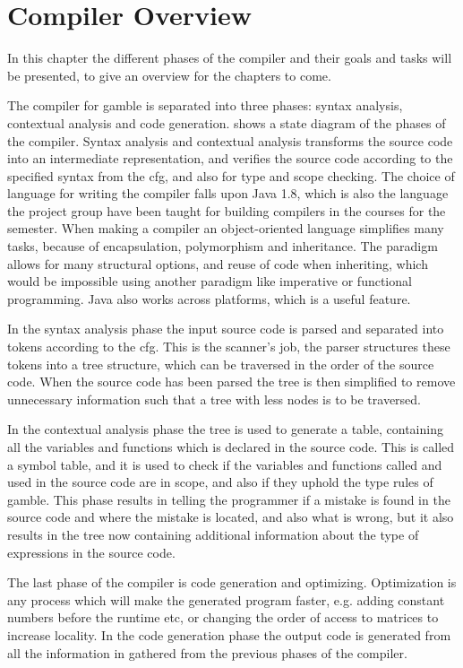 \chapter{Compiler Overview}\label{Chp:CompilerOverview}

In this chapter the different phases of the compiler and their goals and tasks will be presented, to give an overview for the chapters to come.

The compiler for \gls{gamble} is separated into three phases: syntax analysis, contextual analysis and code generation.
 shows a state diagram of the phases of the compiler.
Syntax analysis and contextual analysis transforms the source code into an intermediate representation, and verifies the source code according to the specified syntax from the \acrshort{cfg}, and also for type and scope checking.
The choice of language for writing the compiler falls upon Java 1.8, which is also the language the project group have been taught for building compilers in the courses for the semester.
When making a compiler an object-oriented language simplifies many tasks, because of encapsulation, polymorphism and inheritance. 
The paradigm allows for many structural options, and reuse of code when inheriting, which would be impossible using another paradigm like imperative or functional programming.
Java also works across platforms, which is a useful feature.

In the syntax analysis phase the input source code is parsed and separated into tokens according to the \acrshort{cfg}.
This is the scanner's job, the parser structures these tokens into a tree structure, which can be traversed in the order of the source code.
When the source code has been parsed the tree is then simplified to remove unnecessary information such that a tree with less nodes is to be traversed.

In the contextual analysis phase the tree is used to generate a table, containing all the variables and functions which is declared in the source code.
This is called a symbol table, and it is used to check if the variables and functions called and used in the source code are in scope, and also if they uphold the type rules of \gls{gamble}.
This phase results in telling the programmer if a mistake is found in the source code and where the mistake is located, and also what is wrong, but it also results in the tree now containing additional information about the type of expressions in the source code.

The last phase of the compiler is code generation and optimizing.
Optimization is any process which will make the generated program faster, e.g. adding constant numbers before the runtime etc, or changing the order of access to matrices to increase locality. 
In the code generation phase the output code is generated from all the information in gathered from the previous phases of the compiler.

